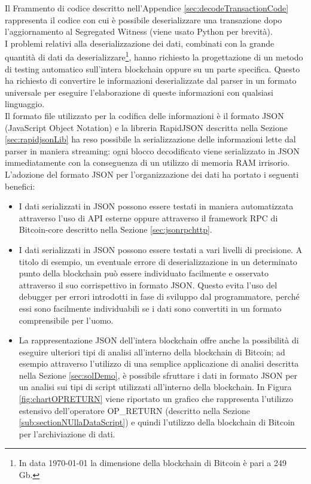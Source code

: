Il Frammento di codice descritto nell'Appendice \ref{sec:decodeTransactionCode} rappresenta il codice con cui è possibile deserializzare una transazione dopo l'aggiornamento al Segregated Witness (viene usato Python per brevità).\\
I problemi relativi alla deserializzazione dei dati, combinati con la grande quantità di dati da deserializzare\footnote{In data {\today} la dimensione della blockchain di Bitcoin è pari a 249 Gb.}, hanno richiesto la progettazione di un metodo di testing automatico sull'intera blockchain oppure su un parte specifica.
Questo ha richiesto di convertire le informazioni deserializzate dal parser in un formato universale per eseguire l'elaborazione di queste informazioni con qualsiasi linguaggio.\\
Il formato file utilizzato per la codifica delle informazioni è il formato JSON (JavaScript Object Notation) e la libreria RapidJSON descritta nella Sezione \ref{sec:rapidjsonLib} ha reso possibile la serializzazione delle informazioni lette dal parser in maniera streaming: ogni blocco decodificato viene serializzato in JSON immediatamente con la conseguenza di un utilizzo di memoria RAM irrisorio.\\
L'adozione del formato JSON per l'organizzazione dei dati ha portato i seguenti benefici:
\begin{itemize}
  \item I dati serializzati in JSON possono essere testati in maniera automatizzata attraverso l'uso di API esterne oppure attraverso il framework RPC di Bitcoin-core descritto nella Sezione \ref{sec:jsonrpchttp}.
  \item I dati serializzati in JSON possono essere testati a vari livelli di precisione. A titolo di esempio, un eventuale errore di deserializzazione in un determinato punto della blockchain può essere individuato facilmente e osservato attraverso il suo corrispettivo in formato JSON.
  Questo evita l'uso del debugger per errori introdotti in fase di sviluppo dal programmatore, perché essi sono facilmente individuabili se i dati sono convertiti in un formato comprensibile per l'uomo.
  \item La rappresentazione JSON dell'intera blockchain offre anche la possibilità di eseguire ulteriori tipi di analisi all'interno della blockchain di Bitcoin; ad esempio attraverso l'utilizzo di una semplice applicazione di analisi descritta nella Sezione \ref{sec:solDemo}, è possibile sfruttare i dati in formato JSON per un analisi sui tipi di script utilizzati all'interno della blockchain.
  In Figura \ref{fig:chartOPRETURN} viene riportato un grafico che rappresenta l'utilizzo estensivo dell'operatore OP\_RETURN (descritto nella Sezione \ref{sub:sectionNUllaDataScript}) e quindi l'utilizzo della blockchain di Bitcoin per l'archiviazione di dati.
\end{itemize}

